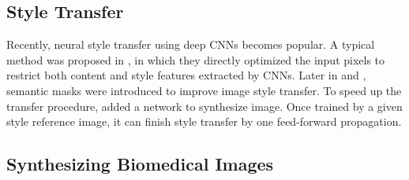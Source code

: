 \documentclass[letterpaper]{article} %
\begin{document}
	\subsection{Style Transfer}
    Recently, neural style transfer using deep CNNs becomes popular. A typical method was proposed in \cite{DBLP:conf/cvpr/GatysEB16}, in which they directly optimized the input pixels to restrict both content and style features extracted by CNNs. 
    Later in \cite{DBLP:conf/cvpr/LuanPSB17} and \cite{DBLP:conf/cvpr/GatysEBHS17}, semantic masks were introduced to improve image style transfer.
	To speed up the transfer procedure, \cite{DBLP:conf/eccv/JohnsonAF16} added a network to synthesize image. Once trained by a given style reference image, it can finish style transfer by one feed-forward propagation. 
	
    	
	\subsection{Synthesizing Biomedical Images}
\end{document}
